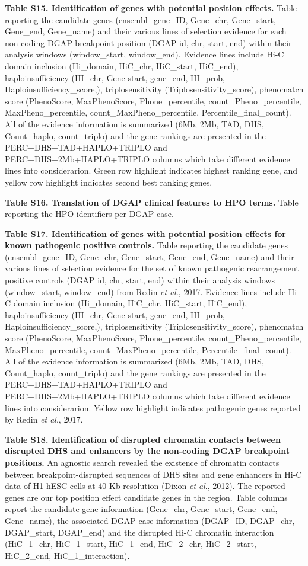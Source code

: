 \documentclass[a4paper,twoside=true,openright,parskip=full,chapterprefix=true,11pt,headings=normal,bibliography=totoc,listof=totoc,titlepage=on,captions=tableabove,draft=false]{scrreprt}
\theoremstyle{definition}
\theoremstyle{definition}
\theoremstyle{definition}
\theoremstyle{remark}
\begin{document}
\textbf{Table S15. Identification of genes with potential position
effects.} Table reporting the candidate genes (ensembl\_gene\_ID,
Gene\_chr, Gene\_start, Gene\_end, Gene\_name) and their various lines
of selection evidence for each non-coding DGAP breakpoint position (DGAP
id, chr, start, end) within their analysis windows (window\_start,
window\_end). Evidence lines include Hi-C domain inclusion (Hi\_domain,
HiC\_chr, HiC\_start, HiC\_end), haploinsufficiency (HI\_chr,
Gene-start, gene\_end, HI\_prob, Haploinsufficiency\_score,),
triplosensitivity (Triplosensitivity\_score), phenomatch score
(PhenoScore, MaxPhenoScore, Phone\_percentile, count\_Pheno\_percentile,
MaxPheno\_percentile, count\_MaxPheno\_percentile,
Percentile\_final\_count). All of the evidence information is summarized
(6Mb, 2Mb, TAD, DHS, Count\_haplo, count\_triplo) and the gene rankings
are presented in the PERC+DHS+TAD+HAPLO+TRIPLO and
PERC+DHS+2Mb+HAPLO+TRIPLO columns which take different evidence lines
into considerarion. Green row highlight indicates highest ranking gene,
and yellow row highlight indicates second best ranking genes.

\textbf{Table S16. Translation of DGAP clinical features to HPO terms.}
Table reporting the HPO identifiers per DGAP case.

\textbf{Table S17. Identification of genes with potential position
effects for known pathogenic positive controls.} Table reporting the
candidate genes (ensembl\_gene\_ID, Gene\_chr, Gene\_start, Gene\_end,
Gene\_name) and their various lines of selection evidence for the set of
known pathogenic rearrangement positive controls (DGAP id, chr, start,
end) within their analysis windows (window\_start, window\_end) from
Redin \emph{et al}., 2017. Evidence lines include Hi-C domain inclusion
(Hi\_domain, HiC\_chr, HiC\_start, HiC\_end), haploinsufficiency
(HI\_chr, Gene-start, gene\_end, HI\_prob, Haploinsufficiency\_score,),
triplosensitivity (Triplosensitivity\_score), phenomatch score
(PhenoScore, MaxPhenoScore, Phone\_percentile, count\_Pheno\_percentile,
MaxPheno\_percentile, count\_MaxPheno\_percentile,
Percentile\_final\_count). All of the evidence information is summarized
(6Mb, 2Mb, TAD, DHS, Count\_haplo, count\_triplo) and the gene rankings
are presented in the PERC+DHS+TAD+HAPLO+TRIPLO and
PERC+DHS+2Mb+HAPLO+TRIPLO columns which take different evidence lines
into considerarion. Yellow row highlight indicates pathogenic genes
reported by Redin \emph{et al}., 2017.

\textbf{Table S18. Identification of disrupted chromatin contacts
between disrupted DHS and enhancers by the non-coding DGAP breakpoint
positions.} An agnostic search revealed the existence of chromatin
contacts between breakpoint-disrupted sequences of DHS sites and gene
enhancers in Hi-C data of H1-hESC cells at 40 Kb resolution (Dixon
\emph{et al}., 2012). The reported genes are our top position effect
candidate genes in the region. Table columns report the candidate gene
information (Gene\_chr, Gene\_start, Gene\_end, Gene\_name), the
associated DGAP case information (DGAP\_ID, DGAP\_chr, DGAP\_start,
DGAP\_end) and the disrupted Hi-C chromatin interaction (HiC\_1\_chr,
HiC\_1\_start, HiC\_1\_end, HiC\_2\_chr, HiC\_2\_start, HiC\_2\_end,
HiC\_1\_interaction).
\end{document}

